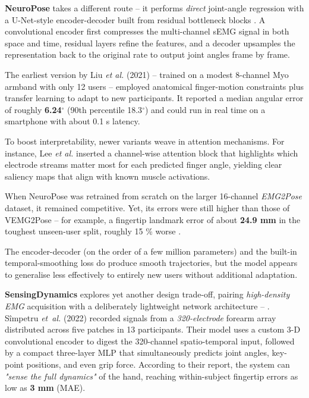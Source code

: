 \textbf{NeuroPose} takes a different route -- it performs \emph{direct} joint-angle regression with a U-Net-style encoder-decoder built from residual bottleneck blocks \cite{liu2021neuropose}. A convolutional encoder first compresses the multi-channel sEMG signal in both space and time, residual layers refine the features, and a decoder upsamples the representation back to the original rate to output joint angles frame by frame.

The earliest version by Liu \textit{et al.} (2021) -- trained on a modest 8-channel Myo armband with only 12 users -- employed anatomical finger-motion constraints plus transfer learning to adapt to new participants. It reported a median angular error of roughly \textbf{6.24$^\circ$} (90th percentile 18.3$^\circ$) and could run in real time on a smartphone with about 0.1 s latency.

To boost interpretability, newer variants weave in attention mechanisms. For instance, Lee \textit{et al.} \cite{lee2022explainable} inserted a channel-wise attention block that highlights which electrode streams matter most for each predicted finger angle, yielding clear saliency maps that align with known muscle activations.

When NeuroPose was retrained from scratch on the larger 16-channel \textit{EMG2Pose} dataset, it remained competitive. Yet, its errors were still higher than those of VEMG2Pose -- for example, a fingertip landmark error of about \textbf{24.9 mm} in the toughest unseen-user split, roughly 15 \% worse \cite{salter2024emg2pose}.

The encoder-decoder (on the order of a few million parameters) and the built-in temporal-smoothing loss do produce smooth trajectories, but the model appears to generalise less effectively to entirely new users without additional adaptation.

\textbf{SensingDynamics} explores yet another design trade-off, pairing \textit{high-density EMG} acquisition with a deliberately lightweight network architecture -- \cite{simpetru10sensing}.
S\^{i}mpetru \textit{et~al.} (2022) recorded signals from a \textit{320-electrode} forearm array distributed across five patches in 13 participants. Their model uses a custom 3-D convolutional encoder to digest the 320-channel spatio-temporal input, followed by a compact three-layer MLP that simultaneously predicts joint angles, key-point positions, and even grip force. According to their report, the system can \emph{"sense the full dynamics"} of the hand, reaching within-subject fingertip errors as low as \textbf{3 mm} (MAE).

